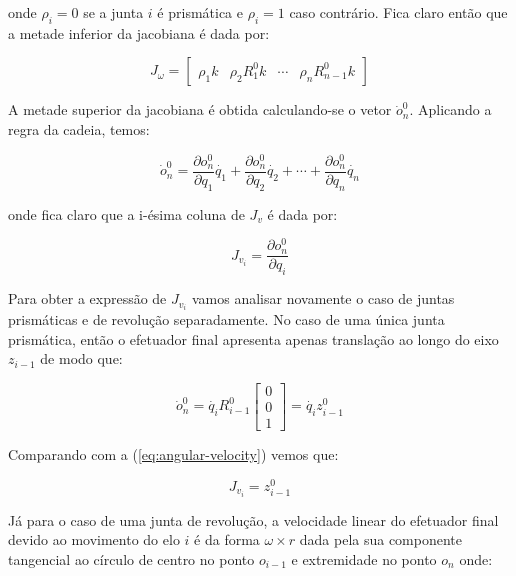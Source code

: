 onde \(\rho_i = 0\) se a junta \(i\) é prismática e \(\rho_i = 1\) caso
contrário. Fica claro então que a metade inferior da jacobiana é dada por:

\begin{equation}
    J_\omega = \begin{bmatrix}
        \rho_1 k & \rho_2 R_1^0 k & \cdots & \rho_n R_{n-1}^0 k
    \end{bmatrix}
\end{equation}

A metade superior da jacobiana é obtida calculando-se o vetor \(\dot{o}_n^0\).
Aplicando a regra da cadeia, temos:

\begin{equation}\label{eq:linear-velocity}
    \dot{o}_n^0 = \frac{\partial o_n^0}{\partial q_1} \dot{q_1} + \frac{\partial o_n^0}{\partial q_2} \dot{q_2} + \cdots + \frac{\partial o_n^0}{\partial q_n} \dot{q_n}
\end{equation}

onde fica claro que a i-ésima coluna de \(J_v\) é dada por:

\begin{equation}
    J_{v_i} = \frac{\partial o_n^0}{\partial q_i}
\end{equation}

Para obter a expressão de \(J_{v_i}\) vamos analisar novamente o caso de juntas
prismáticas e de revolução separadamente. No caso de uma única junta
prismática, então o efetuador final apresenta apenas translação ao longo do
eixo \(z_{i-1}\) de modo que:

\begin{equation}
    \dot{o}_n^0 = \dot{q_i} R_{i-1}^0 \begin{bmatrix}
        0 \\
        0 \\
        1
    \end{bmatrix} = \dot{q_i} z_{i-1}^0
\end{equation}

Comparando com a (\ref{eq:angular-velocity}) vemos que:

\begin{equation}
    J_{v_i} = z_{i-1}^0
\end{equation}

Já para o caso de uma junta de revolução, a velocidade linear do efetuador
final devido ao movimento do elo \(i\) é da forma \(\omega \times r\) dada pela
sua componente tangencial ao círculo de centro no ponto \(o_{i-1}\) e
extremidade no ponto \(o_n\) onde:


